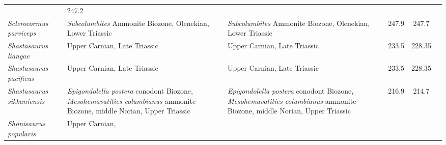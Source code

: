 \begin{longtabu}{>{\itshape}lXXSSl}
                                                             & 247.2
                                                             &
                                                             \cite{Maisch2003NJFGP-A} \\                    
	Sclerocormus parviceps                               &
        \emph{Subcolumbites} Ammonite Biozone, Olenekian, Lower Triassic
                                                             &
        \emph{Subcolumbites} Ammonite Biozone, Olenekian, Lower Triassic
                                                             & 247.9
                                                             & 247.7
                                                             &
                                                             \cite{Jiang2016SR,Motani2017PRSBBS} \\           
	Shastasaurus liangae                                 & Upper Carnian,
        Late Triassic
                                                             & Upper Carnian,
        Late Triassic
                                                             & 233.5
                                                             & 228.35
                                                             & \cite{Yin2000GG} \\                        
	Shastasaurus pacificus                               & Upper Carnian,
        Late Triassic
                                                             & Upper Carnian,
        Late Triassic
                                                             & 233.5
                                                             & 228.35
                                                             &
                                                             \cite{Merriam1908MUC} \\                    
	Shastasaurus sikkaniensis                            &
        \emph{Epigondolella postera} conodont Biozone, \emph{Mesohemavatities
    columbianus} ammonite Biozone, middle Norian, Upper Triassic &
    \emph{Epigondolella postera} conodont Biozone, \emph{Mesohemavatities
columbianus} ammonite Biozone, middle Norian, Upper Triassic & 216.9
                                                             & 214.7
                                                             &
                                                             \cite{Nicholls2004JVP} \\                   
	Shonisaurus popularis                                & Upper Carnian,

\end{longtabu}
